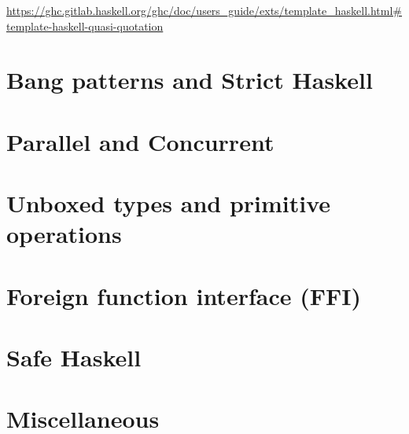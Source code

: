 \documentclass[openany, 12pt]{book}
\begin{document}
\url{https://ghc.gitlab.haskell.org/ghc/doc/users_guide/exts/template_haskell.html#template-haskell-quasi-quotation}

\part{Bang patterns and Strict Haskell}
\part{Parallel and Concurrent}
\part{Unboxed types and primitive operations}
\part{Foreign function interface (FFI)}
\part{Safe Haskell}
\part{Miscellaneous}
\end{document}
